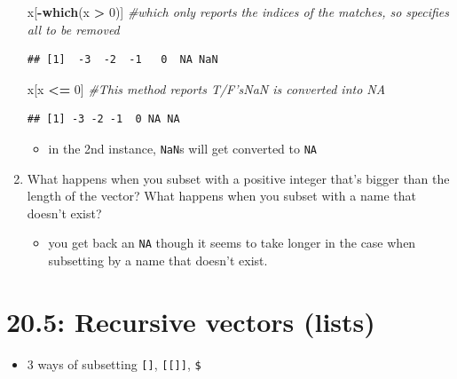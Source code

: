 \documentclass[]{book}
\newenvironment{Shaded}{\begin{snugshade}}{\end{snugshade}}
\newcommand{\CommentTok}[1]{\textcolor[rgb]{0.56,0.35,0.01}{\textit{#1}}}
\newcommand{\DecValTok}[1]{\textcolor[rgb]{0.00,0.00,0.81}{#1}}
\newcommand{\KeywordTok}[1]{\textcolor[rgb]{0.13,0.29,0.53}{\textbf{#1}}}
\newcommand{\NormalTok}[1]{#1}
\newcommand{\OperatorTok}[1]{\textcolor[rgb]{0.81,0.36,0.00}{\textbf{#1}}}
\newcommand{\StringTok}[1]{\textcolor[rgb]{0.31,0.60,0.02}{#1}}
\providecommand{\tightlist}{%
  \setlength{\itemsep}{0pt}\setlength{\parskip}{0pt}}
\theoremstyle{definition}
\theoremstyle{definition}
\theoremstyle{definition}
\theoremstyle{remark}
\begin{document}
\begin{enumerate}
\begin{Shaded}
\begin{Highlighting}[]
\NormalTok{x[}\OperatorTok{-}\KeywordTok{which}\NormalTok{(x }\OperatorTok{>}\StringTok{ }\DecValTok{0}\NormalTok{)]  }\CommentTok{#which only reports the indices of the matches, so specifies all to be removed}
\end{Highlighting}
\end{Shaded}

\begin{verbatim}
## [1]  -3  -2  -1   0  NA NaN
\end{verbatim}

\begin{Shaded}
\begin{Highlighting}[]
\NormalTok{x[x }\OperatorTok{<=}\StringTok{ }\DecValTok{0}\NormalTok{]  }\CommentTok{#This method reports T/F'sNaN is converted into NA}
\end{Highlighting}
\end{Shaded}

\begin{verbatim}
## [1] -3 -2 -1  0 NA NA
\end{verbatim}

  \begin{itemize}
  \tightlist
  \item
    in the 2nd instance, \texttt{NaN}s will get converted to \texttt{NA}
  \end{itemize}
\item
  What happens when you subset with a positive integer that's bigger
  than the length of the vector? What happens when you subset with a
  name that doesn't exist?

  \begin{itemize}
  \tightlist
  \item
    you get back an \texttt{NA} though it seems to take longer in the
    case when subsetting by a name that doesn't exist.
  \end{itemize}
\end{enumerate}

\hypertarget{recursive-vectors-lists}{%
\section{20.5: Recursive vectors
(lists)}\label{recursive-vectors-lists}}

\begin{itemize}
\tightlist
\item
  3 ways of subsetting \texttt{{[}{]}}, \texttt{{[}{[}{]}{]}},
  \texttt{\$}
\end{itemize}
\end{document}
